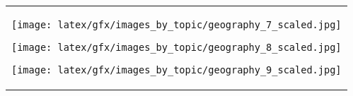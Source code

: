 \begin{table*}[ht]
\begin{tabular}{c}
\begin{minipage}{0.08\textwidth}
                        \centering
                        \texttt{[image: latex/gfx/images\_by\_topic/geography\_7\_scaled.jpg]}
                    \end{minipage}
                    \begin{minipage}{0.08\textwidth}
                        \centering
                        \texttt{[image: latex/gfx/images\_by\_topic/geography\_8\_scaled.jpg]}
                    \end{minipage}
                    \begin{minipage}{0.08\textwidth}
                        \centering
                        \texttt{[image: latex/gfx/images\_by\_topic/geography\_9\_scaled.jpg]}
                    \end{minipage}
                \\
    

\end{tabular}
\end{table*}

